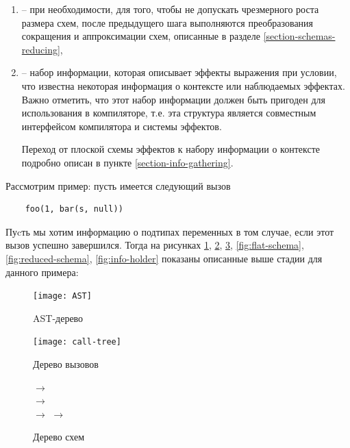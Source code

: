 \begin{enumerate}
	\item {} -- при необходимости, для того, чтобы не допускать чрезмерного роста размера схем, после предыдущего шага выполняются преобразования сокращения и аппроксимации схем, описанные в разделе \ref{section-schemas-reducing}, 
	
	\item {} -- набор информации, которая описывает эффекты выражения при условии, что известна некоторая информация о контексте или наблюдаемых эффектах. Важно отметить, что этот набор информации должен быть пригоден для использования в компиляторе, т.е. эта структура является совместным интерфейсом компилятора и системы эффектов.
	
	Переход от плоской схемы эффектов к набору информации о контексте подробно описан в пункте \ref{section-info-gathering}. 
\end{enumerate}

Рассмотрим пример: пусть имеется следующий вызов

\begin{verbatim}
	foo(1, bar(s, null))
\end{verbatim}

Пуcть мы хотим информацию о подтипах переменных в том случае, если этот вызов успешно завершился. Тогда на рисунках \ref{fig:AST-tree}, \ref{fig:call-tree}, \ref{fig:schemas-tree}, \ref{fig:flat-schema}, \ref{fig:reduced-schema}, \ref{fig:info-holder} показаны описанные выше стадии для данного примера:

\begin{figure}[h]
	\texttt{[image: AST]}
	\caption{AST-дерево}
	\label{fig:AST-tree}
\end{figure}

\begin{figure}[h]
	\texttt{[image: call-tree]}
	\caption{Дерево вызовов}
	\label{fig:call-tree}
\end{figure}

\begin{figure}[h]
	{
		 $\rightarrow$  \\
		
		{
			 $\rightarrow$  \\
			 $\rightarrow$ 
		}
		{
			 $\rightarrow$ 
		}
	}
	{}
	
	\caption{Дерево схем}
	\label{fig:schemas-tree}
\end{figure}

